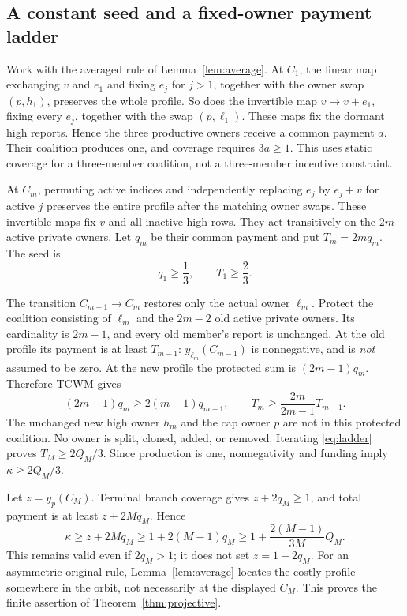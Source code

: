 \documentclass[11pt]{article}
\theoremstyle{definition}\newtheorem{definition}[theorem]{Definition}
\theoremstyle{remark}\newtheorem{remark}[theorem]{Remark}
\begin{document}
\subsection{A constant seed and a fixed-owner payment ladder}
Work with the averaged rule of Lemma~\ref{lem:average}. At $C_1$, the linear
map exchanging $v$ and $e_1$ and fixing $e_j$ for $j>1$, together with the
owner swap $(p,h_1)$, preserves the whole profile. So does the invertible map
$v\mapsto v+e_1$, fixing every $e_j$, together with the swap $(p,\ell_1)$.
These maps fix the dormant high reports. Hence the three productive owners
receive a common payment $a$. Their coalition produces one, and coverage
requires $3a\ge1$. This uses static coverage for a three-member coalition,
not a three-member incentive constraint.

At $C_m$, permuting active indices and independently replacing
$e_j$ by $e_j+v$ for active $j$ preserves the entire profile after the matching
owner swaps. These invertible maps fix $v$ and all inactive high rows.
They act transitively on the $2m$ active private owners. Let $q_m$ be their
common payment and put $T_m=2m q_m$. The seed is
\begin{equation}\label{eq:seed}
 q_1\ge\frac13,\qquad T_1\ge\frac23.
\end{equation}

The transition $C_{m-1}\to C_m$ restores only the actual owner $\ell_m$.
Protect the coalition consisting of $\ell_m$ and the $2m-2$ old active
private owners. Its cardinality is $2m-1$, and every old member's report
is unchanged. At the old profile its payment is at least $T_{m-1}$:
$y_{\ell_m}(C_{m-1})$ is nonnegative, and is \emph{not} assumed to be zero.
At the new profile the protected sum is $(2m-1)q_m$. Therefore TCWM gives
\begin{equation}\label{eq:ladder}
 (2m-1)q_m\ge2(m-1)q_{m-1},\qquad
 T_m\ge\frac{2m}{2m-1}T_{m-1}.
\end{equation}
The unchanged new high owner $h_m$ and the cap owner $p$ are not in this
protected coalition. No owner is split, cloned, added, or removed.
Iterating \eqref{eq:ladder} proves $T_M\ge2Q_M/3$. Since production is one,
nonnegativity and funding imply $\kappa\ge2Q_M/3$.

Let $z=y_p(C_M)$. Terminal branch coverage gives $z+2q_M\ge1$, and total
payment is at least $z+2M q_M$. Hence
\[
 \kappa\ge z+2M q_M\ge1+2(M-1)q_M
 \ge1+\frac{2(M-1)}{3M}Q_M.
\]
This remains valid even if $2q_M>1$; it does not set $z=1-2q_M$.
For an asymmetric original rule, Lemma~\ref{lem:average} locates the costly
profile somewhere in the orbit, not necessarily at the displayed $C_M$.
This proves the finite assertion of Theorem~\ref{thm:projective}.
\end{document}

